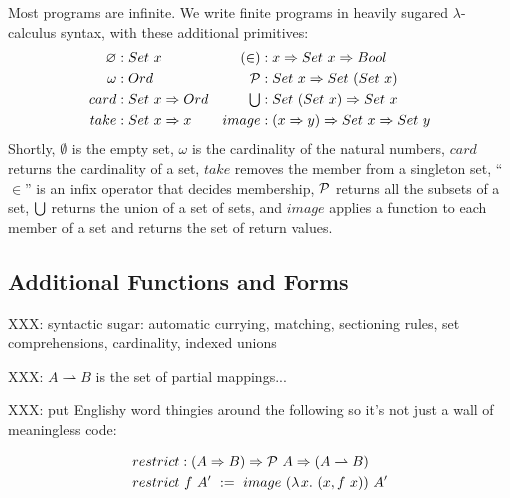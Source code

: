\documentclass[preprint]{sigplanconf}
\newcommand{\pto}{\rightharpoonup}
\begin{document}
Most \lzfclang programs are infinite.
We write finite programs in heavily sugared $\lambda$-calculus syntax, with these additional primitives:
\begin{equation}
\begin{aligned}
	\begin{aligned}
		\varnothing &: Set~x \\
		\omega &: Ord \\
		card &: Set~x \Rightarrow Ord \\
		take &: Set~x \Rightarrow x \\
	\end{aligned}
	&\ \ \ 
	\begin{aligned}
		(\in) &: x \Rightarrow Set~x \Rightarrow Bool \\
		\mathcal{P} &: Set~x \Rightarrow Set~(Set~x) \\
		\textstyle\bigcup &: Set~(Set~x) \Rightarrow Set~x \\
		image &: (x \Rightarrow y) \Rightarrow Set~x \Rightarrow Set~y \\
	\end{aligned} \\
\end{aligned}
\end{equation}
Shortly, $\emptyset$ is the empty set, $\omega$ is the cardinality of the natural numbers, $card$ returns the cardinality of a set, $take$ removes the member from a singleton set, ``$\in$'' is an infix operator that decides membership, $\mathcal{P}$ returns all the subsets of a set, $\textstyle\bigcup$ returns the union of a set of sets, and $image$ applies a function to each member of a set and returns the set of return values.

\subsection{Additional Functions and Forms}

XXX: syntactic sugar: automatic currying, matching, sectioning rules, set comprehensions, cardinality, indexed unions

XXX: $A \pto B$ is the set of partial mappings...

XXX: put Englishy word thingies around the following so it's not just a wall of meaningless code:

\begin{equation}
\begin{aligned}
	&restrict : (A \tto B) \tto \powerset~A \tto (A \pto B) \\
	&restrict~f~A' \ := \ image~(\fun{x}{(x, f~x)})~A'
\end{aligned}
\end{equation}
\end{document}
